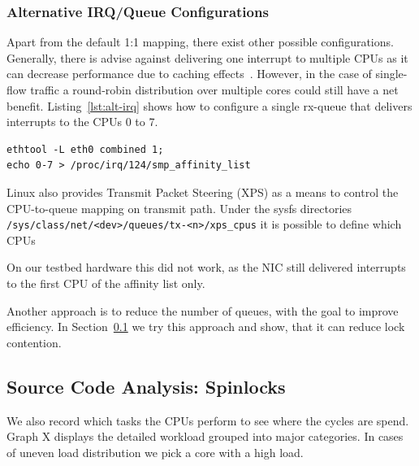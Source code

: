 \documentclass[IN,11pt,twoside,openright,master,english]{tumthesis}
\begin{document}
\subsubsection{Alternative IRQ/Queue Configurations}
Apart from the default 1:1 mapping, there exist other possible configurations.
Generally, there is advise against delivering one interrupt to multiple CPUs as it can decrease performance due to caching effects~\cite{}.
However, in the case of single-flow traffic a round-robin distribution over multiple cores could still have a net benefit. Listing~\ref{lst:alt-irq} shows how to configure a single rx-queue that delivers interrupts to the CPUs 0 to 7.

\begin{lstlisting}[caption={Commands to configure a single RXTX queue and bind it to multiple cores},captionpos=b,label={lst:alt-irq}]
ethtool -L eth0 combined 1;
echo 0-7 > /proc/irq/124/smp_affinity_list
\end{lstlisting}

Linux also provides Transmit Packet Steering (XPS) as a means to control the CPU-to-queue mapping on transmit path. Under the sysfs directories \texttt{/sys/class/net/<dev>/queues/tx-<n>/xps\_cpus} it is possible to define which CPUs 

On our testbed hardware this did not work, as the NIC still delivered interrupts to the first CPU of the affinity list only.

Another approach is to reduce the number of queues, with the goal to improve efficiency. In Section~\ref{sec:linux-code-analysis} we try this approach and show, that it can reduce lock contention.

\subsection{Source Code Analysis: Spinlocks}
\label{sec:linux-code-analysis}
We also record which tasks the CPUs perform to see where the cycles are spend. Graph X displays the detailed workload grouped into major categories.
In cases of uneven load distribution we pick a core with a high load. 
\end{document}
